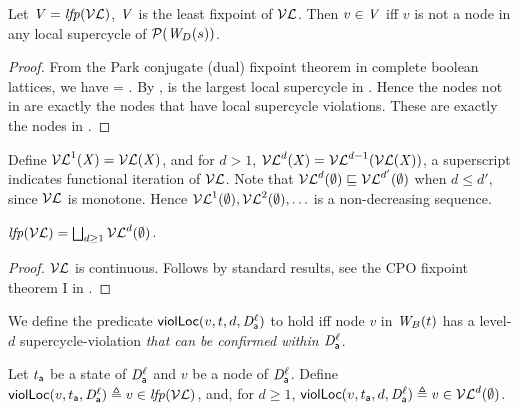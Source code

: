 \begin{proposition} \label{prop:LFPisLocScViolations}
Let  $\VS= \lfp{\lVFs}$, \ie $\VS$ is the least fixpoint of $\lVFs$. Then $v \in \VS$ iff 
$v$ is not a node in any local supercycle of $\lwfgS{B}{s}{\DS}$.
\end{proposition}
%
\begin{proof}
From the Park conjugate (dual) fixpoint theorem in complete boolean lattices, we have 
\lfp{\VFs} = \compl{\gfp{\SFs}}.
By , \gfp{\SFs} is the largest local supercycle in . Hence the nodes not in 
\gfp{\SFs} are exactly the nodes that have local supercycle violations. These are exactly the nodes in \lfp{\VFs}.
\end{proof}

Define $\lVFi{\XS}{1} = \lVF{\XS}$, and for $d > 1$, 
$\lVFi{\XS}{d} = \lVFi{\lVF{\XS}}{d-1}$, \ie a superscript indicates functional iteration
of $\lVFs$. Note that 
$\lVFi{\ewfg}{d} \subg \lVFi{\ewfg}{d'}$ when $d \le d'$, since $\lVFs$
is monotone.
Hence $\lVFi{\ewfg}{1}, \lVFi{\ewfg}{2}, \ldots$ is a non-decreasing sequence.

\begin{proposition} \label{prop:computeLocLFP}
$\lfp{\lVFs} = \JOIN_{d \ge 1} \lVFs^{d} (\ewfg)$.
\end{proposition}
%
\begin{proof}
$\lVFs$ is continuous. Follows by standard results, \eg see the CPO fixpoint theorem I in 
\cite{DP02}.
\end{proof}










We define the predicate $\lviol{v}{d}{t}{\act}{\l}$ to hold iff node $v$ in $\wfg{B}{t}$ has a level-$d$ supercycle-violation
\emph{that can be confirmed within $\dsk{\act}{\l}$}.

\begin{definition}
\label{def:supercycle.violation.local}
\label{defn:supercycle.violation.local}
Let $t_\act$ be a state of $\dsk{\act}{\l}$ and $v$ be a node of $\dsk{\act}{\l}$.
Define 
$\scVL{v}{t_\act}{\act}{\l} \df v \in \lfp{\lVFs}$,
and, for $d \ge 1$, $\scVLd{v}{d}{t_\act}{\act}{\l} \df v \in \lVFs^{d} (\ewfg)$.
\end{definition}


